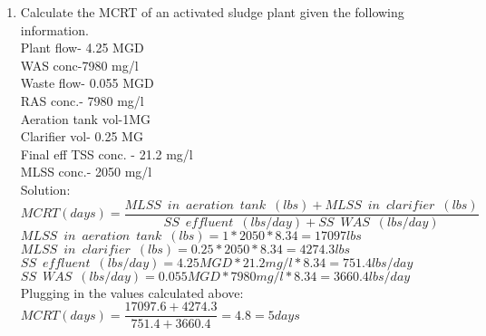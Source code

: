 \documentclass{article}
\begin{document}
\begin{enumerate}


\item Calculate the MCRT of an activated sludge plant given the following information.\\
Plant flow- 4.25 MGD\\
WAS conc-7980 mg/l\\
Waste flow- 0.055 MGD\\
RAS conc.- 7980 mg/l\\
Aeration tank vol-1MG\\  
Clarifier vol- 0.25 MG\\
Final eff TSS conc. - 21.2 mg/l\\
MLSS conc.- 2050 mg/l\\
\vspace{0.3cm}
Solution:\\
\vspace{0.3cm}
$MCRT (days) =  \dfrac{MLSS \enspace in \enspace aeration \enspace tank \enspace (lbs)+MLSS \enspace in \enspace clarifier \enspace (lbs)}{SS \enspace effluent \enspace (lbs/day)+SS \enspace WAS \enspace (lbs/day)}$\\
\vspace{0.3cm} 
$MLSS \enspace in \enspace aeration \enspace tank \enspace (lbs)=1*2050*8.34=17097lbs$\\
\vspace{0.3cm} 
$MLSS \enspace in \enspace clarifier \enspace (lbs)=0.25*2050*8.34=4274.3lbs$\\
\vspace{0.3cm} 
$SS \enspace effluent \enspace (lbs/day)=4.25MGD *21.2mg/l*8.34=751.4lbs/day$\\
\vspace{0.3cm} 
$SS \enspace WAS \enspace (lbs/day)=0.055MGD *7980mg/l*8.34=3660.4lbs/day$\\
\vspace{0.3cm} 
Plugging in the values calculated above: $MCRT (days) =  \dfrac{17097.6+4274.3}{751.4+3660.4}=4.8=\boxed{5days}$\\
\vspace{0.2cm}
\pagebreak


\end{enumerate}
\end{document}
